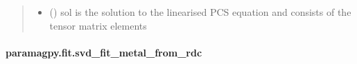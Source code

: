 \documentclass[a4paper,10pt,english,openany,oneside]{sphinxmanual}
\begin{document}
\begin{fulllineitems}
\begin{quote}
\begin{description}
\begin{itemize}
\item {} 
\sphinxAtStartPar
{} () \textendash{} sol is the solution to the linearised PCS equation and
consists of the tensor matrix elements

\end{itemize}


\end{description}\end{quote}

\end{fulllineitems}



\paragraph{paramagpy.fit.svd\_fit\_metal\_from\_rdc}
\label{\detokenize{reference/generated/paramagpy.fit.svd_fit_metal_from_rdc:paramagpy-fit-svd-fit-metal-from-rdc}}\label{\detokenize{reference/generated/paramagpy.fit.svd_fit_metal_from_rdc::doc}}
\end{document}
